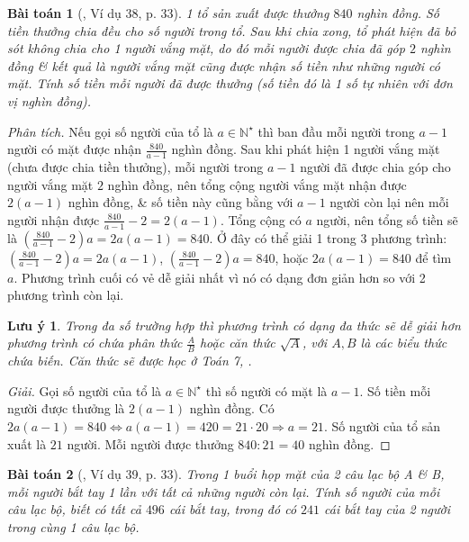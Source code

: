 \documentclass{article}
\numberwithin{equation}{section}
\newtheorem{baitoan}{Bài toán}[section]
\newtheorem{luuy}{Lưu ý}[section]
\begin{document}
\begin{baitoan}[\cite{Binh_Toan_6_tap_1}, Ví dụ 38, p. 33]
	1 tổ sản xuất được thưởng $840$ nghìn đồng. Số tiền thưởng chia đều cho số người trong tổ. Sau khi chia xong, tổ phát hiện đã bỏ sót không chia cho 1 người vắng mặt, do đó mỗi người được chia đã góp $2$ nghìn đồng \& kết quả là người vắng mặt cũng được nhận số tiền như những người có mặt. Tính số tiền mỗi người đã được thưởng (số tiền đó là 1 số tự nhiên với đơn vị nghìn đồng).
\end{baitoan}
\noindent\textit{Phân tích.} Nếu gọi số người của tổ là $a\in\mathbb{N}^\star$ thì ban đầu mỗi người trong $a - 1$ người có mặt được nhận $\frac{840}{a - 1}$ nghìn đồng. Sau khi phát hiện 1 người vắng mặt (chưa được chia tiền thưởng), mỗi người trong $a - 1$ người đã được chia góp cho người vắng mặt $2$ nghìn đồng, nên tổng cộng người vắng mặt nhận được $2(a - 1)$ nghìn đồng, \& số tiền này cũng bằng với $a - 1$ người còn lại nên mỗi người nhận được $\frac{840}{a - 1} - 2 = 2(a - 1)$. Tổng cộng có $a$ người, nên tổng số tiền sẽ là $\left(\frac{840}{a - 1} - 2\right)a = 2a(a - 1) = 840$. Ở đây có thể giải 1 trong 3 phương trình: $\left(\frac{840}{a - 1} - 2\right)a = 2a(a - 1)$, $\left(\frac{840}{a - 1} - 2\right)a = 840$, hoặc $2a(a - 1) = 840$ để tìm $a$. Phương trình cuối có vẻ dễ giải nhất vì nó có dạng đơn giản hơn so với 2 phương trình còn lại.

\begin{luuy}
	Trong đa số trường hợp thì phương trình có dạng đa thức sẽ dễ giải hơn phương trình có chứa phân thức $\frac{A}{B}$ hoặc căn thức $\sqrt{A}$, với $A,B$ là các biểu thức chứa biến. Căn thức sẽ được học ở Toán 7, \cite{SGK_Toan_7_Canh_Dieu_tap_1}.
\end{luuy}

\begin{proof}[Giải]
	Gọi số người của tổ là $a\in\mathbb{N}^\star$ thì số người có mặt là $a - 1$. Số tiền mỗi người được thưởng là $2(a - 1)$ nghìn đồng. Có $2a(a - 1) = 840\Leftrightarrow a(a - 1) = 420 = 21\cdot 20$$\Rightarrow a = 21$. Số người của tổ sản xuất là $21$ người. Mỗi người được thưởng $840:21 = 40$ nghìn đồng.
\end{proof}

\begin{baitoan}[\cite{Binh_Toan_6_tap_1}, Ví dụ 39, p. 33]
	Trong 1 buổi họp mặt của 2 câu lạc bộ A \& B, mỗi người bắt tay 1 lần với tất cả những người còn lại. Tính số người của mỗi câu lạc bộ, biết có tất cả $496$ cái bắt tay, trong đó có $241$ cái bắt tay của 2 người trong cùng 1 câu lạc bộ.
\end{baitoan}
\end{document}

